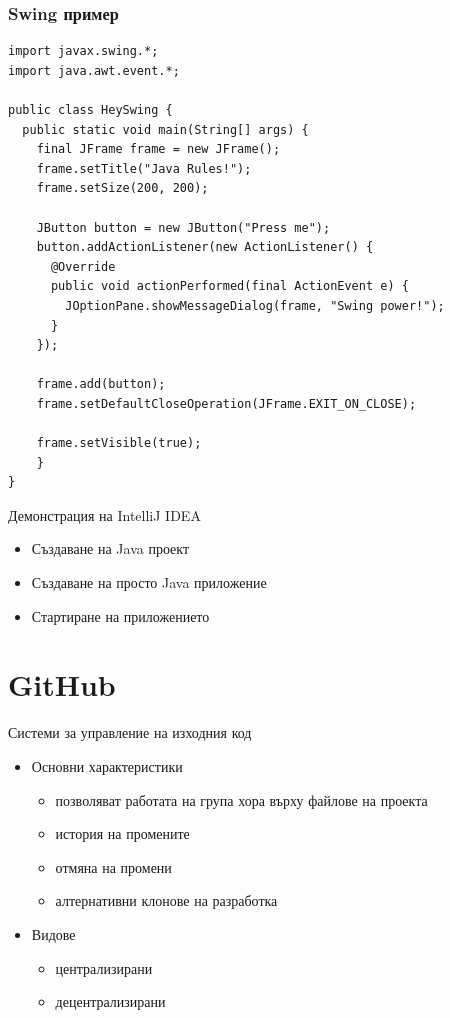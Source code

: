 \documentclass{beamer}
\begin{document}
\begin{frame}[fragile]
  \frametitle{Swing пример}
  \transdissolve
\begin{lstlisting}[basicstyle=\tiny]
import javax.swing.*;
import java.awt.event.*;

public class HeySwing {
  public static void main(String[] args) {
    final JFrame frame = new JFrame();
    frame.setTitle("Java Rules!");
    frame.setSize(200, 200);

    JButton button = new JButton("Press me");
    button.addActionListener(new ActionListener() {
      @Override
      public void actionPerformed(final ActionEvent e) {
        JOptionPane.showMessageDialog(frame, "Swing power!");
      }
    });

    frame.add(button);
    frame.setDefaultCloseOperation(JFrame.EXIT_ON_CLOSE);

    frame.setVisible(true);
    }
}
\end{lstlisting}
\end{frame}

\begin{frame}{Демонстрация на IntelliJ IDEA}
  \transdissolve
  \begin{itemize}
    \item Създаване на Java проект
    \item Създаване на просто Java приложение
    \item Стартиране на приложението
  \end{itemize}
\end{frame}

\section{GitHub}
\begin{frame}{Системи за управление на изходния код}
  \transdissolve
  \begin{itemize}
  \item Основни характеристики
    \begin{itemize}
      \item позволяват работата на група хора върху файлове на проекта
      \item история на промените
      \item отмяна на промени
      \item алтернативни клонове на разработка
    \end{itemize}
  \item Видове
    \begin{itemize}
      \item централизирани
      \item децентрализирани
    \end{itemize}
  \end{itemize}
\end{frame}
\end{document}
